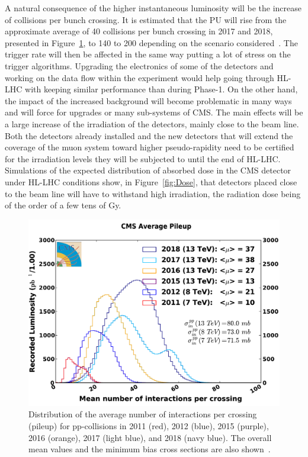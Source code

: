 	A natural consequence of the higher instantaneous luminosity will be the increase of collisions per bunch crossing. It is estimated that the \acl{PU} will rise from the approximate average of 40 collisions per bunch crossing in 2017 and 2018, presented in Figure~\ref{fig:CMS-pileup}, to 140 to 200 depending on the scenario considered~\cite{MEDINAMEDRANO2017}. The trigger rate will then be affected in the same way putting a lot of stress on the trigger algorithms. Upgrading the electronics of some of the detectors and working on the data flow within the experiment would help going through HL-LHC with keeping similar performance than during Phase-1. On the other hand, the impact of the increased background will become problematic in many ways and will force for upgrades or many sub-systems of CMS. The main effects will be a large increase of the irradiation of the detectors, mainly close to the beam line. Both the detectors already installed and the new detectors that will extend the coverage of the muon system toward higher pseudo-rapidity need to be certified for the irradiation levels they will be subjected to until the end of HL-LHC. Simulations of the expected distribution of absorbed dose in the CMS detector under HL-LHC conditions show, in Figure~\ref{fig:Dose}, that detectors placed close to the beam line will have to withstand high irradiation, the radiation dose being of the order of a few tens of \si{Gy}.
	
\begingroup\setlength{\intextsep}{-2pt}\setlength{\columnsep}{15pt}

	\begin{figure}
		\centering
		\includegraphics[width=\linewidth]{fig/chapt4/CMS_pileup_pp_2018.pdf}
		\caption{\label{fig:CMS-pileup} Distribution of the average number of interactions per crossing (pileup) for pp-collisions in 2011 (red), 2012 (blue), 2015 (purple), 2016 (orange), 2017 (light blue), and 2018 (navy blue). The overall mean values and the minimum bias cross sections are also shown~\cite{LUMIPUBLICCMS}.}
	\end{figure}

